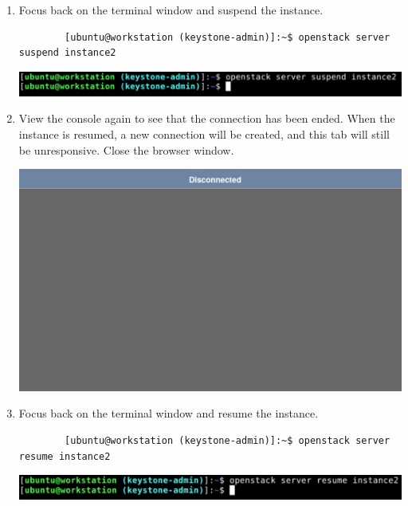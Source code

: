 \documentclass[letterpaper, 12pt]{article}
\begin{document}
\begin{enumerate}
    \item Focus back on the terminal window and suspend the instance.
    \begin{lstlisting}
        [ubuntu@workstation (keystone-admin)]:~$ openstack server suspend instance2
    \end{lstlisting}

    \begin{center}
        \includegraphics[width=\linewidth]{images/part4/step10.png}
    \end{center}

    \item View the console again to see that the connection has been ended.
    When the instance is resumed, a new connection will be created, and this tab will still be unresponsive.
    Close the browser window.

    \begin{center}
        \includegraphics[width=\linewidth]{images/part4/step11.png}
    \end{center}

    \item Focus back on the terminal window and resume the instance.
    \begin{lstlisting}
        [ubuntu@workstation (keystone-admin)]:~$ openstack server resume instance2
    \end{lstlisting}

    \begin{center}
        \includegraphics[width=\linewidth]{images/part4/step12.png}
    \end{center}


\end{enumerate}
\end{document}
